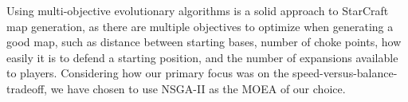 Using multi-objective evolutionary algorithms is a solid approach to StarCraft map generation, as there are multiple objectives to optimize when generating a good map, such as distance between starting bases, number of choke points, how easily it is to defend a starting position, and the number of expansions available to players. Considering how our primary focus was on the speed-versus-balance-tradeoff, we have chosen to use NSGA-II as the MOEA of our choice.